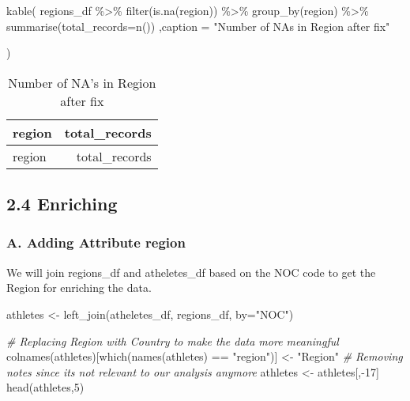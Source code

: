 \documentclass[
]{article}
\newenvironment{Shaded}{\begin{snugshade}}{\end{snugshade}}
\newcommand{\AttributeTok}[1]{\textcolor[rgb]{0.77,0.63,0.00}{#1}}
\newcommand{\CommentTok}[1]{\textcolor[rgb]{0.56,0.35,0.01}{\textit{#1}}}
\newcommand{\DecValTok}[1]{\textcolor[rgb]{0.00,0.00,0.81}{#1}}
\newcommand{\FunctionTok}[1]{\textcolor[rgb]{0.00,0.00,0.00}{#1}}
\newcommand{\NormalTok}[1]{#1}
\newcommand{\OtherTok}[1]{\textcolor[rgb]{0.56,0.35,0.01}{#1}}
\newcommand{\SpecialCharTok}[1]{\textcolor[rgb]{0.00,0.00,0.00}{#1}}
\newcommand{\StringTok}[1]{\textcolor[rgb]{0.31,0.60,0.02}{#1}}
\begin{document}
\begin{Shaded}
\begin{Highlighting}[]
\FunctionTok{kable}\NormalTok{(}
\NormalTok{  regions\_df }\SpecialCharTok{\%\textgreater{}\%}
    \FunctionTok{filter}\NormalTok{(}\FunctionTok{is.na}\NormalTok{(region)) }\SpecialCharTok{\%\textgreater{}\%}
    \FunctionTok{group\_by}\NormalTok{(region) }\SpecialCharTok{\%\textgreater{}\%}
    \FunctionTok{summarise}\NormalTok{(}\AttributeTok{total\_records=}\FunctionTok{n}\NormalTok{())}
\NormalTok{  ,}\AttributeTok{caption =} \StringTok{"Number of NA\textquotesingle{}s in Region after fix"}
  
\NormalTok{)}
\end{Highlighting}
\end{Shaded}

\begin{longtable}[]{@{}lr@{}}
\caption{Number of NA's in Region after fix}\tabularnewline
\toprule
region & total\_records \\
\midrule
\endfirsthead
\toprule
region & total\_records \\
\midrule
\endhead
\bottomrule
\end{longtable}

\hypertarget{enriching}{%
\subsection{2.4 Enriching}\label{enriching}}

\hypertarget{a.-adding-attribute-region}{%
\subsubsection{A. Adding Attribute
region}\label{a.-adding-attribute-region}}

We will join regions\_df and atheletes\_df based on the NOC code to get
the Region for enriching the data.

\begin{Shaded}
\begin{Highlighting}[]
\NormalTok{athletes }\OtherTok{\textless{}{-}} \FunctionTok{left\_join}\NormalTok{(atheletes\_df, regions\_df, }\AttributeTok{by=}\StringTok{"NOC"}\NormalTok{)}

\CommentTok{\# Replacing Region with Country to make the data more meaningful}
\FunctionTok{colnames}\NormalTok{(athletes)[}\FunctionTok{which}\NormalTok{(}\FunctionTok{names}\NormalTok{(athletes) }\SpecialCharTok{==} \StringTok{"region"}\NormalTok{)] }\OtherTok{\textless{}{-}} \StringTok{"Region"} 
\CommentTok{\# Removing notes since it\textquotesingle{}s not relevant to our analysis anymore}
\NormalTok{athletes }\OtherTok{\textless{}{-}}\NormalTok{ athletes[,}\SpecialCharTok{{-}}\DecValTok{17}\NormalTok{]}
\FunctionTok{head}\NormalTok{(athletes,}\DecValTok{5}\NormalTok{)}
\end{Highlighting}
\end{Shaded}
\end{document}
